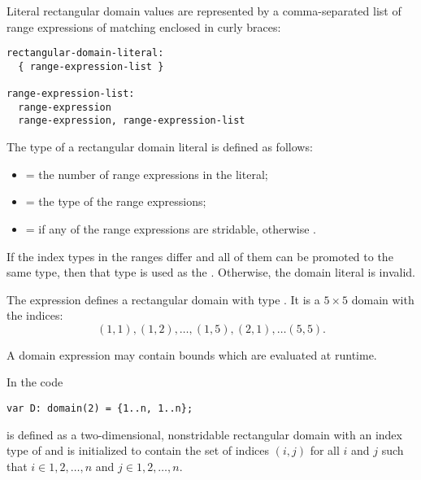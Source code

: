 
Literal rectangular domain values are represented by a comma-separated
list of range expressions of matching  enclosed in
curly braces:


\begin{syntax}
\begin{verbatim}
rectangular-domain-literal:
  { range-expression-list }

range-expression-list:
  range-expression
  range-expression, range-expression-list
\end{verbatim}
\end{syntax}

\noindent The type of a rectangular domain literal is defined as follows:

\begin{itemize}
\item {} = the number of range expressions in the literal;
\item {} = the type of the range expressions;
\item {} =  if any of the range expressions
are stridable, otherwise .
\end{itemize}
\noindent If the index types in the ranges differ and all of them can be
promoted to the same type, then that type is used as the .
Otherwise, the domain literal is invalid.

\begin{example}
The expression  defines a rectangular domain with
type   .
It is a $5 \times 5$ domain with the indices:
\begin{equation}
(1, 1), (1, 2), \ldots, (1, 5), (2, 1), \ldots (5, 5).
\end{equation}
\end{example}

A domain expression may contain bounds which are evaluated at runtime.
\begin{example}
In the code
\begin{chapel}
\begin{verbatim}
var D: domain(2) = {1..n, 1..n};
\end{verbatim}
\end{chapel}

 is defined as a two-dimensional, nonstridable rectangular
domain with an index type of  and is initialized to
contain the set of indices $(i,j)$ for all $i$ and $j$ such that
$i \in {1, 2, \ldots, n}$ and $j \in {1, 2, \ldots, n}$.
\end{example}

